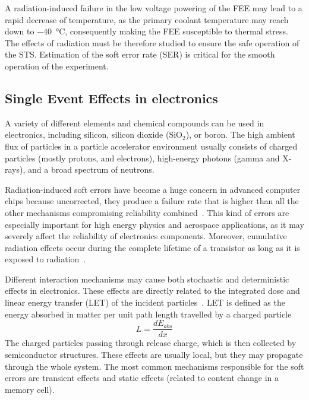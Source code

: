 A radiation-induced failure in the low voltage powering of the FEE may lead to a rapid decrease of temperature, as the primary coolant temperature may reach down to \SI{-40}{\celsius}, consequently making the FEE susceptible to thermal stress. The effects of radiation must be therefore studied to ensure the safe operation of the \gls{STS}. Estimation of the soft error rate (\gls{SER}) is critical for the smooth operation of the experiment. 


\subsection{Single Event Effects in electronics}

A variety of different elements and chemical compounds can be used in electronics, including silicon, silicon dioxide ($\mathrm{SiO}_{2}$), or boron. The high ambient flux of particles in a particle accelerator environment usually consists of charged particles (mostly protons, and electrons), high-energy photons (gamma and X-rays), and a broad spectrum of neutrons.

 Radiation-induced soft errors have become a huge concern in advanced computer chips because uncorrected, they produce a failure rate that is higher than all the other mechanisms compromising reliability combined~\cite{1545891}. This kind of errors are especially important for high energy physics and aerospace applications, as it may severely affect the reliability of electronics components. Moreover, cumulative radiation effects occur during the complete lifetime of a transistor as long as it is exposed to radiation~\cite{RodriguezRodriguez2020}.

Different interaction mechanisms may cause both stochastic and deterministic effects in electronics. These effects are directly related to the integrated dose and linear energy transfer (\gls{LET}) of the incident particles~\cite{electronic_system_on_module}.  LET is defined as the energy absorbed in matter per unit path length travelled by a charged particle
\begin{equation}
    L = \frac{dE_{abs}}{dx}
\end{equation}
The charged particles passing through release charge, which is then collected by semiconductor structures. These effects are usually local, but they may propagate through the whole system. The most common mechanisms responsible for the soft errors are transient effects and static effects (related to content change in a memory cell). 

